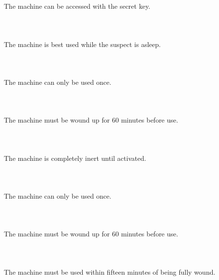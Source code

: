 \documentclass{article}
\begin{document}
    \section{}
    The machine can be accessed with the secret key.\\\\ 
    \newpage
    
    \section{}
    The machine is best used while the suspect is asleep.\\\\ 
    \newpage
    
    \section{}
    The machine can only be used once.\\\\ 
    \newpage
    
    \section{}
    The machine must be wound up for 60 minutes before use.\\\\ 
    \newpage
    
    \section{}
    The machine is completely inert until activated.\\\\ 
    \newpage
    
    \section{}
    The machine can only be used once.\\\\ 
    \newpage
    
    \section{}
    The machine must be wound up for 60 minutes before use.\\\\ 
    \newpage
    
    \section{}
    The machine must be used within fifteen minutes of being fully wound.\\\\ 
    \newpage
    
\end{document}
